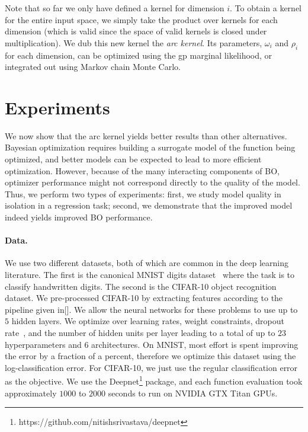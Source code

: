 \documentclass{article}
\newcommand{\gp}{{\sc gp}}
\begin{document}
Note that so far we only have defined a kernel for dimension $i$. To obtain a kernel for the entire input space, we simply take the product over kernels for each dimension (which is valid since the space of valid kernels is closed under multiplication).
We dub this new kernel the \emph{arc kernel}. Its parameters, $\omega_i$ and $\rho_i$ for each dimension, can be optimized using the \gp{} marginal likelihood, or integrated out using Markov chain Monte Carlo.


\section{Experiments}
\vspace{-0.05in} 

We now show that the arc kernel yields better results than other alternatives.  Bayesian optimization requires building a surrogate model of the function being optimized, and better models can be expected to lead to more efficient optimization.  However, because of the many interacting components of BO, optimizer performance might not correspond directly to the quality of the model.  Thus, we perform two types of experiments: first, we study model quality in isolation in a regression task; second, we demonstrate that the improved model indeed yields improved BO performance.

\paragraph{Data.} We use two different datasets, both of which are common in the deep learning literature. The first is the canonical MNIST digits dataset~\cite{lecun-1998a} where the task is to classify handwritten digits. The second is the CIFAR-10 object recognition dataset. We pre-processed CIFAR-10 by extracting features according to the pipeline given in[]. We allow the neural networks for these problems to use up to $5$ hidden layers. We optimize over learning rates, weight constraints, dropout rate~\cite{hinton2012improving}, and the number of hidden units per layer leading to a total of up to $23$ hyperparameters and $6$ architectures. On MNIST, most effort is spent improving the error by a fraction of a percent, therefore we optimize this dataset using the log-classification error. For CIFAR-10, we just use the regular classification error as the objective. We use the Deepnet\footnote{https://github.com/nitishsrivastava/deepnet} package, and each function evaluation took approximately $1000$ to $2000$ seconds to run on NVIDIA GTX Titan GPUs.
\end{document}
